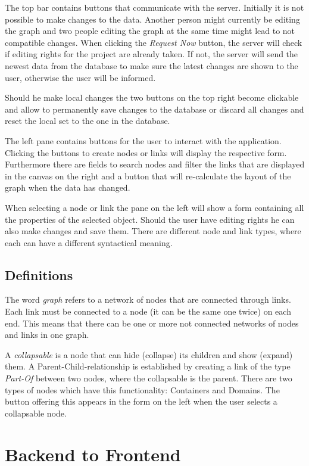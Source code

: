 The top bar contains buttons that communicate with the server. Initially it is not possible to make changes to the data. Another person might currently be editing the graph and two people editing the graph at the same time might lead to not compatible changes. When clicking the \emph{Request Now} button, the server will check if editing rights for the project are already taken. If not, the server will send the newest data from the database to make sure the latest changes are shown to the user, otherwise the user will be informed.

Should he make local changes the two buttons on the top right become clickable and allow to permanently save changes to the database or discard all changes and reset the local set to the one in the database.

The left pane contains buttons for the user to interact with the application. Clicking the buttons to create nodes or links will display the respective form.
Furthermore there are fields to search nodes and filter the links that are displayed in the canvas on the right and a button that will re-calculate the layout of the graph when the data has changed.

When selecting a node or link the pane on the left will show a form containing all the properties of the selected object. Should the user have editing rights he can also make changes and save them. There are different node and link types, where each can have a different syntactical meaning.

\section{Definitions}
The word \emph{graph} refers to a network of nodes that are connected through links. Each link must be connected to a node (it can be the same one twice) on each end. This means that there can be one or more not connected networks of nodes and links in one graph.

A \emph{collapsable} is a node that can hide (collapse) its children and show (expand) them. A Parent-Child-relationship is established by creating a link of the type \emph{Part-Of} between two nodes, where the collapsable is the parent. There are two types of nodes which have this functionality: Containers and Domains. The button offering this appears in the form on the left when the user selects a collapsable node.

\chapter{Backend to Frontend}

